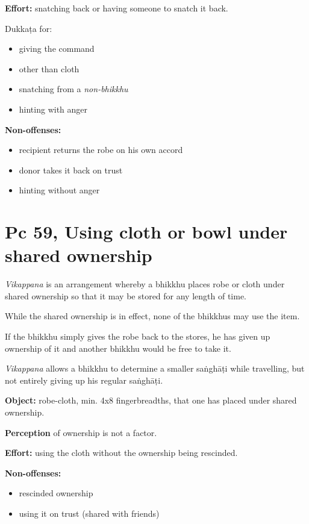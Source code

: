 \textbf{Effort:} snatching back or having someone to snatch it back.

\begin{multicols}{2}

Dukkaṭa for:

\begin{itemize}
\tightlist
\item
  giving the command
\item
  other than cloth
\item
  snatching from a \emph{non-bhikkhu}
\item
  hinting with anger
\end{itemize}

\columnbreak

\textbf{Non-offenses:}

\begin{itemize}
\tightlist
\item
  recipient returns the robe on his own accord
\item
  donor takes it back on trust
\item
  hinting without anger
\end{itemize}

\end{multicols}

\section{Pc 59, Using cloth or bowl under shared ownership}

\emph{Vikappana} is an arrangement whereby a bhikkhu places robe or
cloth under shared ownership so that it may be stored for any length of
time.

While the shared ownership is in effect, none of the bhikkhus may use
the item.

If the bhikkhu simply gives the robe back to the stores, he has given up
ownership of it and another bhikkhu would be free to take it.

\emph{Vikappana} allows a bhikkhu to determine a smaller saṅghāṭi while
travelling, but not entirely giving up his regular saṅghāṭi.

\textbf{Object:} robe-cloth, min. 4x8 fingerbreadths, that one has
placed under shared ownership.

\textbf{Perception} of ownership is not a factor.

\textbf{Effort:} using the cloth without the ownership being rescinded.

\textbf{Non-offenses:}

\begin{itemize}
\tightlist
\item
  rescinded ownership
\item
  using it on trust (shared with friends)
\end{itemize}

